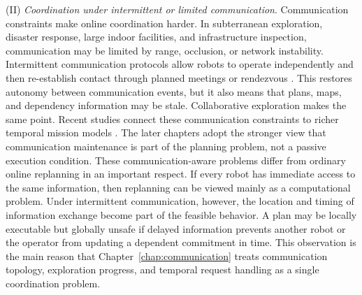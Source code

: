 (II) \emph{Coordination under intermittent or limited communication}.
Communication constraints make online coordination harder. In subterranean exploration,
disaster response, large indoor facilities, and infrastructure inspection, communication
may be limited by range, occlusion, or network instability. Intermittent communication
protocols allow robots to operate independently and then re-establish contact through
planned meetings or rendezvous \citep{stump2011connectivity, hollinger2013sampling,
nikou2016cooperative}. This restores autonomy between communication events, but it also
means that plans, maps, and dependency information may be stale. Collaborative exploration
makes the same point.  Recent studies connect these
communication constraints to richer temporal mission models \citep{guo2024teamwise,
guo2025moroco, ansari2024colossi, silva2026probabilistic}. The later chapters adopt the
stronger view that communication maintenance is part of the planning problem, not a
passive execution condition.
These communication-aware problems differ from ordinary online replanning in an important
respect. If every robot has immediate access to the same information, then replanning can
be viewed mainly as a computational problem. Under intermittent communication, however,
the location and timing of information exchange become part of the feasible behavior. A
plan may be locally executable but globally unsafe if delayed information prevents another
robot or the operator from updating a dependent commitment in time. This observation is
the main reason that Chapter~\ref{chap:communication} treats communication topology,
exploration progress, and temporal request handling as a single coordination problem.


